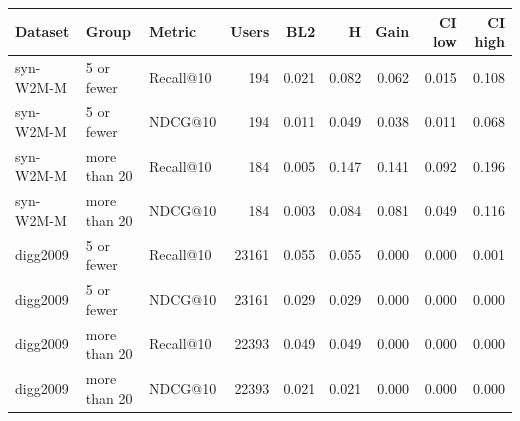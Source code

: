 \begin{tabular}{lllrrrrrr}
\toprule
Dataset & Group & Metric & Users & BL2 & H & Gain & CI low & CI high \\
\midrule
syn-W2M-M & 5 or fewer & Recall@10 & 194 & 0.021 & 0.082 & 0.062 & 0.015 & 0.108 \\
syn-W2M-M & 5 or fewer & NDCG@10 & 194 & 0.011 & 0.049 & 0.038 & 0.011 & 0.068 \\
syn-W2M-M & more than 20 & Recall@10 & 184 & 0.005 & 0.147 & 0.141 & 0.092 & 0.196 \\
syn-W2M-M & more than 20 & NDCG@10 & 184 & 0.003 & 0.084 & 0.081 & 0.049 & 0.116 \\
digg2009 & 5 or fewer & Recall@10 & 23161 & 0.055 & 0.055 & 0.000 & 0.000 & 0.001 \\
digg2009 & 5 or fewer & NDCG@10 & 23161 & 0.029 & 0.029 & 0.000 & 0.000 & 0.000 \\
digg2009 & more than 20 & Recall@10 & 22393 & 0.049 & 0.049 & 0.000 & 0.000 & 0.000 \\
digg2009 & more than 20 & NDCG@10 & 22393 & 0.021 & 0.021 & 0.000 & 0.000 & 0.000 \\
\bottomrule
\end{tabular}
